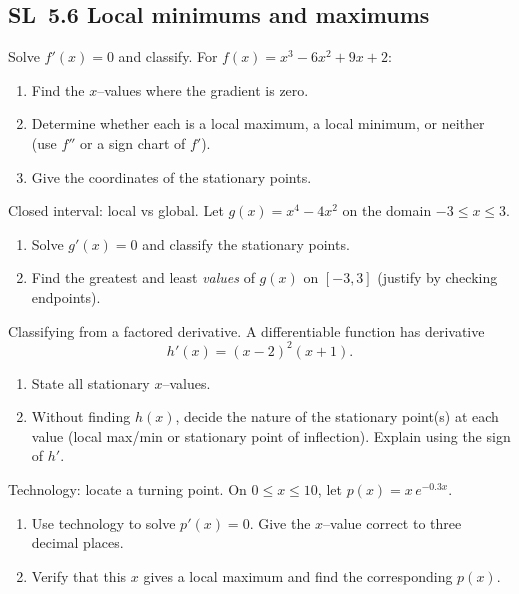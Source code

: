 \documentclass[11pt]{article}
\def\textbf#1{#1}%
\newcommand{\tocsubsection}[1]{\subsection{#1}}
\newcounter{question}
\begin{document}
\tocsubsection{SL 5.6 \; Local minimums and maximums}


\begin{question}
\textbf{Solve $f'(x)=0$ and classify.}
For $f(x)=x^{3}-6x^{2}+9x+2$:
\begin{enumerate}
  \item Find the $x$–values where the gradient is zero.
  \item Determine whether each is a local maximum, a local minimum, or neither (use $f''$ or a sign chart of $f'$).
  \item Give the coordinates of the stationary points.
\end{enumerate}
\end{question}

\begin{question}
\textbf{Closed interval: local vs global.}
Let $g(x)=x^{4}-4x^{2}$ on the domain $-3\le x\le 3$.
\begin{enumerate}
  \item Solve $g'(x)=0$ and classify the stationary points.
  \item Find the greatest and least \emph{values} of $g(x)$ on $[-3,3]$ (justify by checking endpoints).
\end{enumerate}
\end{question}

\begin{question}
\textbf{Classifying from a factored derivative.}
A differentiable function has derivative
\[
h'(x)=(x-2)^{2}(x+1).
\]
\begin{enumerate}
  \item State all stationary $x$–values.
  \item Without finding $h(x)$, decide the nature of the stationary point(s) at each value (local max/min or stationary point of inflection). Explain using the sign of $h'$.
\end{enumerate}
\end{question}

\begin{question}
\textbf{Technology: locate a turning point.}
On $0\le x\le 10$, let $p(x)=x\,e^{-0.3x}$.
\begin{enumerate}
  \item Use technology to solve $p'(x)=0$. Give the $x$–value correct to three decimal places.
  \item Verify that this $x$ gives a local maximum and find the corresponding $p(x)$.
\end{enumerate}
\end{question}
\end{document}
